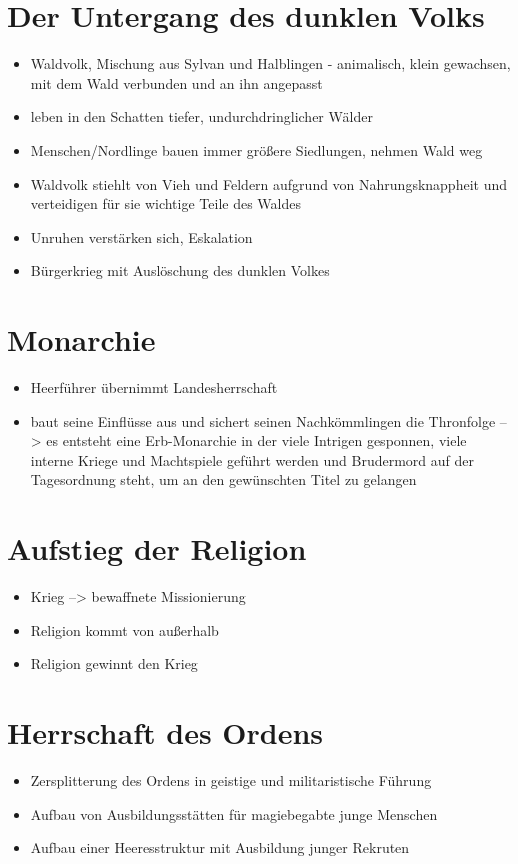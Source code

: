 \section{Der Untergang des dunklen Volks}
\begin{itemize}
	\item Waldvolk, Mischung aus Sylvan und Halblingen - animalisch, klein gewachsen, mit dem Wald verbunden und an ihn angepasst
	\item leben in den Schatten tiefer, undurchdringlicher Wälder
	\item Menschen/Nordlinge bauen immer größere Siedlungen, nehmen Wald weg
	\item Waldvolk stiehlt von Vieh und Feldern aufgrund von Nahrungsknappheit und verteidigen für sie wichtige Teile des Waldes
	\item Unruhen verstärken sich, Eskalation
	\item Bürgerkrieg mit Auslöschung des dunklen Volkes
\end{itemize}

\section{Monarchie}
\begin{itemize}
	\item Heerführer übernimmt Landesherrschaft
	\item baut seine Einflüsse aus und sichert seinen Nachkömmlingen die Thronfolge --> es entsteht eine Erb-Monarchie in der viele Intrigen gesponnen, viele interne Kriege und Machtspiele geführt werden und Brudermord auf der Tagesordnung steht, um an den gewünschten Titel zu gelangen
\end{itemize}

\section{Aufstieg der Religion}
\begin{itemize}
	\item Krieg --> bewaffnete Missionierung
	\item Religion kommt von außerhalb
	\item Religion gewinnt den Krieg
\end{itemize}

\section{Herrschaft des Ordens}
\begin{itemize}
	\item Zersplitterung des Ordens in geistige und militaristische Führung
	\item Aufbau von Ausbildungsstätten für magiebegabte junge Menschen
	\item Aufbau einer Heeresstruktur mit Ausbildung junger Rekruten
	
\end{itemize}

